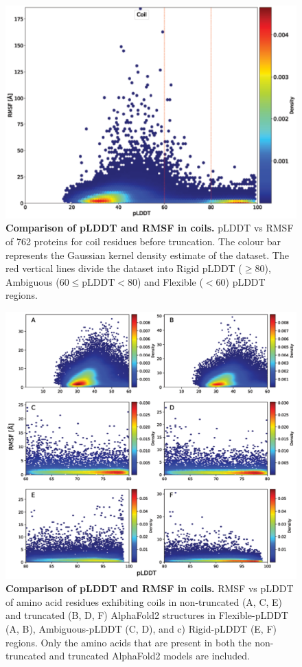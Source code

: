 \begin{figure}[H]
    \centering
    \includegraphics[width=0.75\linewidth]{pLDDT//plddt_figures//supplementary_bhawna/supfig12.pdf}
\caption{\textbf{Comparison of pLDDT and RMSF in coils.} pLDDT vs RMSF of 762 proteins for coil residues before truncation. The colour bar represents the Gaussian kernel density estimate of the dataset. The red vertical lines divide the dataset into Rigid pLDDT ($\geq 80$), Ambiguous ($60 \leq \text{pLDDT} < 80$) and Flexible ($< 60$) pLDDT regions.}
    \label{fig:plddt_sup:sup12}
\end{figure}


\begin{figure}[H]
    \centering
    \includegraphics[width=\linewidth]{pLDDT//plddt_figures//supplementary_bhawna/supfig13.pdf}
    \caption{\textbf{Comparison of pLDDT and RMSF in coils.} RMSF vs pLDDT of amino acid residues exhibiting coils in non-truncated (A, C, E) and truncated (B, D, F) AlphaFold2 structures in Flexible-pLDDT (A, B), Ambiguous-pLDDT (C, D), and c) Rigid-pLDDT (E, F) regions. Only the amino acids that are present in both the non-truncated and truncated AlphaFold2 models are included.}
    \label{fig:plddt_sup:sup13}
\end{figure}

